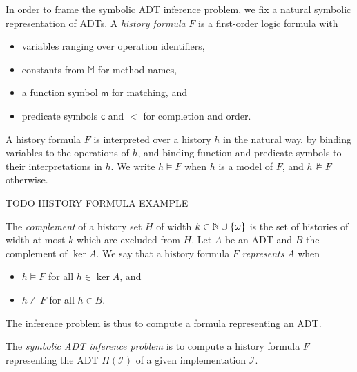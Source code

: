 In order to frame the symbolic ADT inference problem, we fix a natural symbolic
representation of ADTs. A \emph{history formula} $F$ is a first-order logic
formula with
\begin{itemize}

  \item variables ranging over operation identifiers,

  \item constants from $\mathbb{M}$ for method names,

  \item a function symbol $\mathsf{m}$ for matching, and

  \item predicate symbols $\mathsf{c}$ and $\mathsf{<}$ for completion and
  order.

\end{itemize}
A history formula $F$ is interpreted over a history $h$ in the natural way, by
binding variables to the operations of $h$, and binding function and predicate
symbols to their interpretations in $h$. We write $h \models F$ when $h$ is a
model of $F$, and $h \not\models F$ otherwise.

\begin{example}

  TODO HISTORY FORMULA EXAMPLE

\end{example}

The \emph{complement} of a history set $H$ of width $k \in \mathbb{N} \cup
{\{{\omega}\}}$ is the set of histories of width at most $k$ which are excluded
from $H$. Let $A$ be an ADT and $B$ the complement of $\ker A$. We say that
a history formula $F$ \emph{represents} $A$ when
\begin{itemize}

  \item $h \models F$ for all $h \in \ker A$, and

  \item $h \not\models F$ for all $h \in B$.

\end{itemize}
The inference problem is thus to compute a formula representing an ADT.

\begin{definition}

  The \emph{symbolic ADT inference problem} is to compute a history formula $F$
  representing the ADT $H(\mathcal{I})$ of a given implementation $\mathcal{I}$.

\end{definition}
